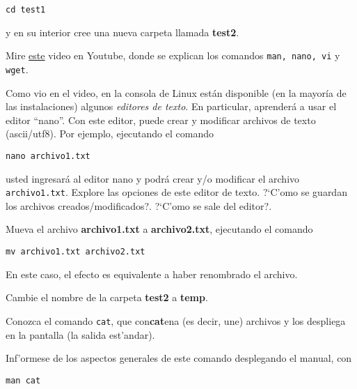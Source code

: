 \documentclass[11pt]{exam}
\begin{document}
\begin{questions}
\begin{parts}
\begin{verbatim}
cd test1
\end{verbatim}

y en su interior cree una nueva carpeta llamada \textbf{test2}.

\item Mire \href{https://www.youtube.com/watch?v=4Cz8E71PYd4}{este} video en Youtube, donde se explican los comandos \texttt{man, nano, vi} y \texttt{wget}.

\item Como vio en el video, en la consola de Linux están disponible (en la mayoría de las instalaciones) algunos \textit{editores de texto}. En particular, aprenderá a usar el editor ``nano''. Con este editor, puede crear y modificar archivos de texto (ascii/utf8). Por ejemplo, ejecutando el comando 

\begin{verbatim}
nano archivo1.txt
\end{verbatim}

usted ingresará al editor nano y podrá crear y/o modificar el archivo \texttt{archivo1.txt}.
 Explore las opciones de este editor de texto. ?`C'omo se guardan los archivos creados/modi\-fi\-ca\-dos?. ?`C'omo se sale del editor?.

\item Mueva el archivo \textbf{archivo1.txt} a \textbf{archivo2.txt}, ejecutando el comando

\begin{verbatim}
mv archivo1.txt archivo2.txt
\end{verbatim}

En este caso, el efecto es equivalente a haber renombrado el archivo.

\item Cambie el nombre de la carpeta \textbf{test2} a \textbf{temp}.

\end{parts}

\item Conozca el comando \texttt{cat}, que con\textbf{cat}ena (es decir, une) archivos y los despliega en la pantalla (la salida est'andar).
\begin{parts}
\item  Inf'ormese de los aspectos generales de este comando desplegando el manual, con 

\begin{verbatim}
man cat
\end{verbatim}




\end{parts}
\end{questions}
\end{document}

